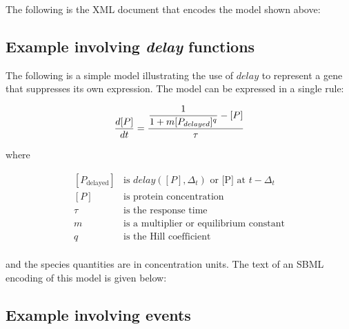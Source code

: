 The following is the XML document that encodes the model shown
above:



\subsection{Example involving \emph{delay} functions}
\label{sec:delayeg}

The following is a simple model illustrating the use of $delay$ to
represent a gene that suppresses its own expression.  The model
can be expressed in a single rule:
\begin{linenomath}
\begin{equation*}
  \frac{d [P]}{d t} = \dfrac{ \dfrac{1}{1 + m [P_{delayed}]^q} - [P] }{ \tau }\\
\end{equation*}
\end{linenomath}
where
\begin{linenomath}
  \begin{equation*}
    \begin{array}{rll}
      [P_\text{delayed}] & \text{is } delay([P], \Delta_t) \text{ or [P] at } t - \Delta_t\\[0pt]
      [P]           & \text{is protein concentration}\\
      \tau          & \text{is the response time}\\
      m             & \text{is a multiplier or equilibrium constant}\\
      q             & \text{is the Hill coefficient}\\
    \end{array}
  \end{equation*}
\end{linenomath}
and the species quantities are in concentration units.
The text of an SBML encoding of this model is given below:



\subsection{Example involving events}
\label{sec:eventeg}

